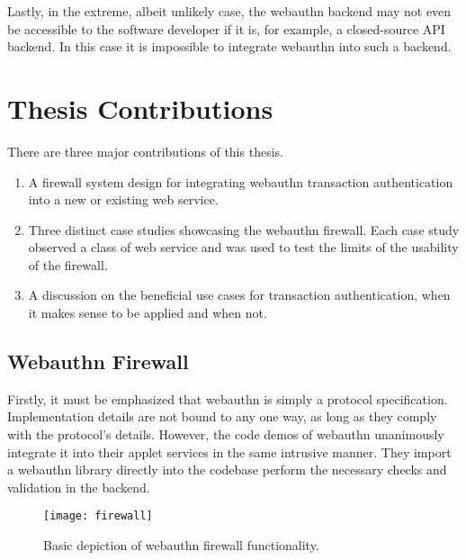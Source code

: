 Lastly, in the extreme, albeit unlikely case, the webauthn backend may not even be accessible to the software developer if it is, for example, a closed-source API backend. In this case it is impossible to integrate webauthn into such a backend.

\section{Thesis Contributions}

There are three major contributions of this thesis. 

\begin{enumerate}[nosep]

\item A firewall system design for integrating webauthn transaction authentication into a new or existing web service.

\item Three distinct case studies showcasing the webauthn firewall. Each case study observed a class of web service and was used to test the limits of the usability of the firewall.

\item A discussion on the beneficial use cases for transaction authentication, when it makes sense to be applied and when not.

\end{enumerate}


\subsection{Webauthn Firewall}

Firstly, it must be emphasized that webauthn is simply a protocol specification. Implementation details are not bound to any one way, as long as they comply with the protocol's details. However, the code demos of webauthn unanimously integrate it into their applet services in the same intrusive manner. They import a webauthn library \cite{TODO-webauthn-libraries} directly into the codebase perform the necessary checks and validation in the backend.

\begin{figure}[h]
  \centering
  \texttt{[image: firewall]}
  \caption{Basic depiction of webauthn firewall functionality.}
\end{figure}

